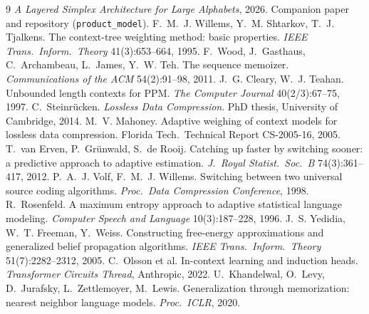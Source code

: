 \documentclass[11pt]{article}
\begin{document}
\begin{thebibliography}{9}
\emph{A Layered Simplex Architecture for Large Alphabets}, 2026.
Companion paper and repository (\texttt{product\_model}).
F.~M.~J. Willems, Y.~M. Shtarkov, T.~J. Tjalkens.
The context-tree weighting method: basic properties.
\emph{IEEE Trans.\ Inform.\ Theory} 41(3):653--664, 1995.
F.~Wood, J.~Gasthaus, C.~Archambeau, L.~James, Y.~W. Teh.
The sequence memoizer.
\emph{Communications of the ACM} 54(2):91--98, 2011.
J.~G. Cleary, W.~J. Teahan.
Unbounded length contexts for PPM.
\emph{The Computer Journal} 40(2/3):67--75, 1997.
C.~Steinr\"ucken.
\emph{Lossless Data Compression}.
PhD thesis, University of Cambridge, 2014.
M.~V. Mahoney.
Adaptive weighing of context models for lossless data compression.
Florida Tech.\ Technical Report CS-2005-16, 2005.
T.~van Erven, P.~Gr\"unwald, S.~de Rooij.
Catching up faster by switching sooner: a predictive approach to
adaptive estimation.
\emph{J.\ Royal Statist.\ Soc.\ B} 74(3):361--417, 2012.
P.~A.~J. Volf, F.~M.~J. Willems.
Switching between two universal source coding algorithms.
\emph{Proc.\ Data Compression Conference}, 1998.
R.~Rosenfeld.
A maximum entropy approach to adaptive statistical language
modeling.
\emph{Computer Speech and Language} 10(3):187--228, 1996.
J.~S. Yedidia, W.~T. Freeman, Y.~Weiss.
Constructing free-energy approximations and generalized belief
propagation algorithms.
\emph{IEEE Trans.\ Inform.\ Theory} 51(7):2282--2312, 2005.
C.~Olsson et al.
In-context learning and induction heads.
\emph{Transformer Circuits Thread}, Anthropic, 2022.
U.~Khandelwal, O.~Levy, D.~Jurafsky, L.~Zettlemoyer, M.~Lewis.
Generalization through memorization: nearest neighbor language
models.
\emph{Proc.\ ICLR}, 2020.
\end{thebibliography}
\end{document}
